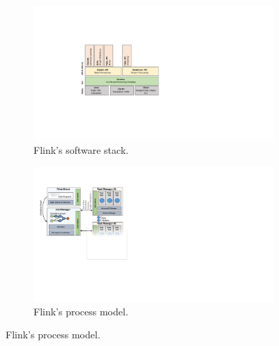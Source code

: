 \documentclass[11pt]{article}
\begin{document}
\begin{figure}[t!]
\begin{minipage}{1.1\linewidth}
      \centering
      \hspace{-0.1\linewidth}
      \begin{minipage}{0.48\linewidth}
          \begin{figure}[H]
              \centering
			\includegraphics[width=.88\textwidth]{figs/stack}
			\vspace{-3mm}
			\caption{Flink's software stack.}
			\vspace{-3mm}
			\label{fig:stack}
          \end{figure}
      \end{minipage}
      \begin{minipage}{0.5\linewidth}
          \begin{figure}[H]
				\includegraphics[width=.95\textwidth]{figs/architecture.pdf}
    			\vspace{-2.5mm}
    			\caption{Flink's process model.}
    			\label{fig:process-model}
          \end{figure}
      \end{minipage}
  \end{minipage}
\end{figure}
\end{document}
